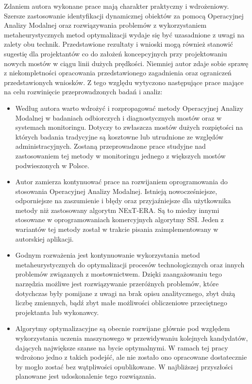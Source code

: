 Zdaniem autora wykonane prace mają charakter praktyczny i wdrożeniowy. Szersze zastosowanie identyfikacji dynamicznej obiektów za pomocą Operacyjnej Analizy Modalnej oraz rozwiązywania problemów z wykorzystaniem metaheurystycznych metod optymalizacji wydaje się być uzasadnione z uwagi na zalety obu technik. Przedstawione rezultaty i wnioski mogą również stanowić sugestię dla projektantów co do założeń koncepcyjnych przy projektowaniu nowych mostów w ciągu linii dużych prędkości. Niemniej autor zdaje sobie sprawę z niekompletności opracowania przedstawionego zagadnienia oraz ograniczeń przedstawionych wniosków. Z tego względu wytyczono następujące prace mające na celu rozwinięcie przeprowadzonych badań i analiz:
\begin{itemize}
	\item Według autora warto wdrożyć i rozpropagować metody Operacyjnej Analizy Modalnej w badaniach odbiorczych i diagnostycznych mostów oraz w systemach monitoringu. Dotyczy to zwłaszcza mostów dużych rozpiętości na których badania tradycyjne są kosztowne lub utrudnione ze względów administracyjnych. Zostaną przeprowadzone prace studyjne nad zastosowaniem tej metody w monitoringu jednego z większych mostów podwieszonych w Polsce.
	\item Autor zamierza kontynuować prace na rozwijaniem oprogramowania do stosowania Operacyjnej Analizy Modalnej. Istnieją nowocześniejsze, odporniejsze na zaszumienie i błędy oraz przyjaźniejsze dla użytkownika metody niż zastosowany algorytm NExT-ERA. Są to miedzy innymi stosowane w oprogramowaniach komercyjnych algorytmy SSI. Jeden z wariantów tej metody został w trakcie pisania zaimplementowany w autorskiej aplikacji.
	\item Godnym rozważenia jest kontynuowanie wykorzystania metod metaheurystycznych do optymalizacji procesów technologicznych oraz innych problemów związanych z mostownictwem. Dzięki zaangażowaniu tego narzędzia możliwe jest rozwiązywanie przeróżnych problemów, które dotychczas były pomijane z uwagi na brak opisu analitycznego, zbyt dużą liczbę zmiennych, bądź zbyt małe możliwości obliczeniowe przeciętnego projektanta lub wykonawcy.
	\item  Algorytmy optymalizacyjne są obecnie rozwijane głównie pod względem wykorzystania uczenia maszynowego w przewidywaniu kolejnych kandydatów, dających największe szanse na bycie optymalnymi. W ramach tej pracy wdrożono jedno z takich podejść, ale nie zostało ono opracowane dostatecznie by mogło zostać bez wątpliwości opublikowane. W najbliższej przyszłości planowane jest udoskonalenie tego rozwiązania.
\end{itemize}  

